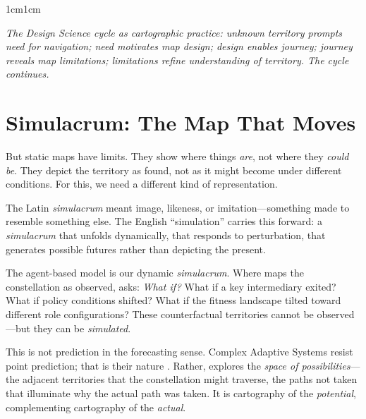 \documentclass[../main.tex]{subfiles}
\begin{document}
\begin{adjustwidth}{1cm}{1cm}
\begin{center}

\small\textit{The Design Science cycle as cartographic practice: unknown territory prompts need for navigation; need motivates map design; design enables journey; journey reveals map limitations; limitations refine understanding of territory. The cycle continues.}\normalsize
\end{center}

\vspace{0.5cm}

\section*{Simulacrum: The Map That Moves}

But static maps have limits. They show where things \textit{are}, not where they \textit{could be}. They depict the territory as found, not as it might become under different conditions. For this, we need a different kind of representation.

The Latin \textit{simulacrum} meant image, likeness, or imitation---something made to resemble something else. The English ``simulation'' carries this forward: a \textit{simulacrum} that unfolds dynamically, that responds to perturbation, that generates possible futures rather than depicting the present.

The \textbf{\RoleSim} agent-based model is our dynamic \textit{simulacrum}. Where \RoleBox maps the constellation as observed, \RoleSim asks: \textit{What if?} What if a key intermediary exited? What if policy conditions shifted? What if the fitness landscape tilted toward different role configurations? These counterfactual territories cannot be observed---but they can be \textit{simulated}.

This is not prediction in the forecasting sense. Complex Adaptive Systems resist point prediction; that is their nature \cite{holland1995hidden,kauffman1993origins}. Rather, \RoleSim explores the \textit{space of possibilities}---the adjacent territories that the constellation might traverse, the paths not taken that illuminate why the actual path was taken. It is cartography of the \textit{potential}, complementing cartography of the \textit{actual}.


\end{adjustwidth}
\end{document}

